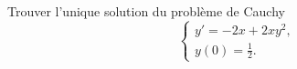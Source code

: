 
\begin{exercice}\label{exosession1-0006}

Trouver l'unique solution du problème de Cauchy 
\begin{equation*}
  \begin{cases}
    y'=-2x+2xy^2, \\
    y(0)= \frac{1}{2}.
  \end{cases}
\end{equation*}



\end{exercice}

